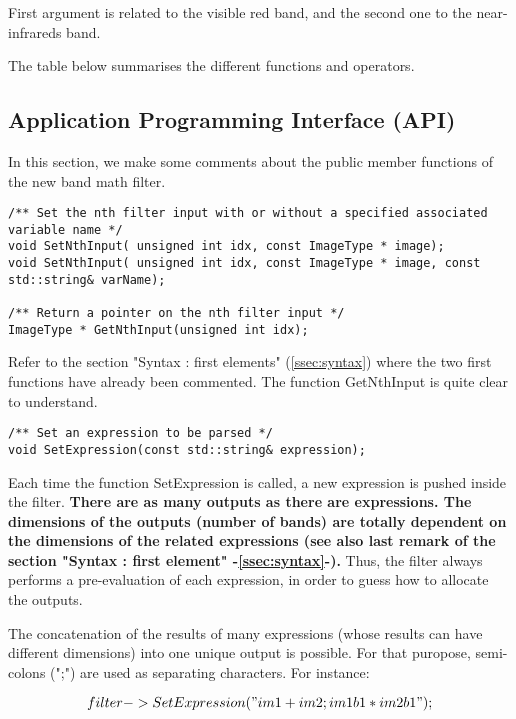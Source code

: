 First argument is related to the visible red band, and the second one to the near-infrareds band.

The table below summarises the different functions and operators.



\subsection{Application Programming Interface (API)}\label{ssec:API}

In this section, we make some comments about the public member functions of the new band math filter.

\begin{verbatim}
/** Set the nth filter input with or without a specified associated variable name */
void SetNthInput( unsigned int idx, const ImageType * image);
void SetNthInput( unsigned int idx, const ImageType * image, const std::string& varName);

/** Return a pointer on the nth filter input */
ImageType * GetNthInput(unsigned int idx);
\end{verbatim}

Refer to the section "Syntax : first elements" (\ref{ssec:syntax}) 
where the two first functions have already been commented. 
The function GetNthInput is quite clear to understand.

\begin{verbatim}
/** Set an expression to be parsed */
void SetExpression(const std::string& expression);
\end{verbatim}

Each time the function  SetExpression is called, a new expression is 
pushed inside the filter. \textbf{There are as many outputs as there 
are expressions. The dimensions of the outputs (number of bands) are 
totally dependent on the dimensions of the related expressions (see 
also last remark of the section "Syntax : first element" -\ref{ssec:syntax}-).} 
Thus, the filter always performs a pre-evaluation of each expression, 
in order to guess how to allocate the outputs.

The concatenation of the results of many expressions (whose results 
can have different dimensions) into one unique output is possible. 
For that puropose, semi-colons (";") are used as separating characters. 
For instance:

\begin{equation}
	filter->SetExpression("im1 + im2 ; im1b1*im2b1");
\end{equation}

